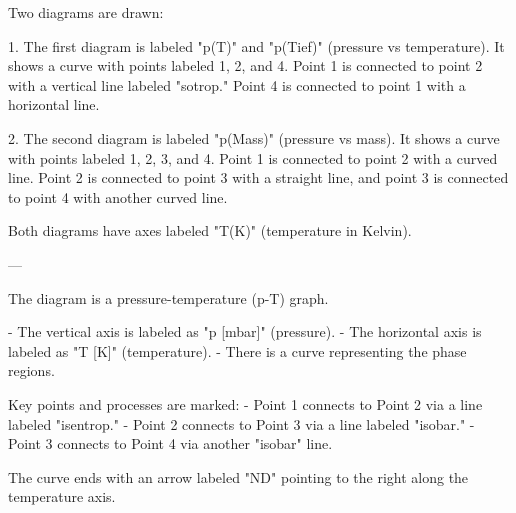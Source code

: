 Two diagrams are drawn:  

1. The first diagram is labeled "p(T)" and "p(Tief)" (pressure vs temperature). It shows a curve with points labeled 1, 2, and 4. Point 1 is connected to point 2 with a vertical line labeled "sotrop." Point 4 is connected to point 1 with a horizontal line.  

2. The second diagram is labeled "p(Mass)" (pressure vs mass). It shows a curve with points labeled 1, 2, 3, and 4. Point 1 is connected to point 2 with a curved line. Point 2 is connected to point 3 with a straight line, and point 3 is connected to point 4 with another curved line.  

Both diagrams have axes labeled "T(K)" (temperature in Kelvin).  

---

The diagram is a pressure-temperature (p-T) graph.  

- The vertical axis is labeled as "p [mbar]" (pressure).  
- The horizontal axis is labeled as "T [K]" (temperature).  
- There is a curve representing the phase regions.  

Key points and processes are marked:  
- Point 1 connects to Point 2 via a line labeled "isentrop."  
- Point 2 connects to Point 3 via a line labeled "isobar."  
- Point 3 connects to Point 4 via another "isobar" line.  

The curve ends with an arrow labeled "ND" pointing to the right along the temperature axis.